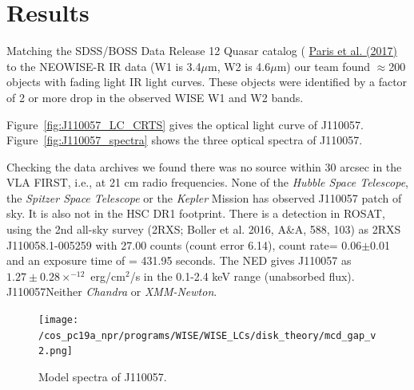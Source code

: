 \documentclass{nature}
\begin{document}
\section{Results}  
Matching the SDSS/BOSS Data Release 12 Quasar catalog (
\href{http://adsabs.harvard.edu/abs/2017A\%26A...597A..79P}{Paris et
al. (2017)} to the NEOWISE-R IR data (W1 is 3.4$\mu$m, W2 is
4.6$\mu$m) our team found $\approx$200 objects with fading light IR
light curves. These objects were identified by a factor of 2 or more
drop in the observed WISE W1 and W2 bands.  

Figure~\ref{fig:J110057_LC_CRTS} gives the optical light curve of
J110057.  Figure~\ref{fig:J110057_spectra} shows the three optical
spectra of J110057. 

Checking the data archives we found there was 
no source within 30 arcsec in the VLA FIRST, i.e., at 21 cm radio frequencies.
None of the {\it Hubble Space Telescope}, the {\it Spitzer Space
Telescope} or the {\it Kepler} Mission has observed J110057 patch of
sky. It is also not in the HSC DR1 footprint.  There is a detection in
ROSAT, using the 2nd all-sky survey (2RXS; Boller et al. 2016, A\&A,
588, 103) as 2RXS J110058.1-005259 with 27.00 counts (count error
6.14), count rate= 0.06$\pm$0.01 and an exposure time of = 431.95
seconds.  The NED gives J110057 as $1.27\pm0.28 \times^{-12}$
erg/cm$^{2}$/s in the 0.1-2.4 keV range (unabsorbed
flux). J110057Neither {\it Chandra} or {\it XMM-Newton}.



\begin{figure}
  \texttt{[image: /cos\_pc19a\_npr/programs/WISE/WISE\_LCs/disk\_theory/mcd\_gap\_v2.png]}
  \centering
  \caption[]{Model spectra of J110057. }
  \label{fig:J110057_diskmodel}
\end{figure}
\end{document}

